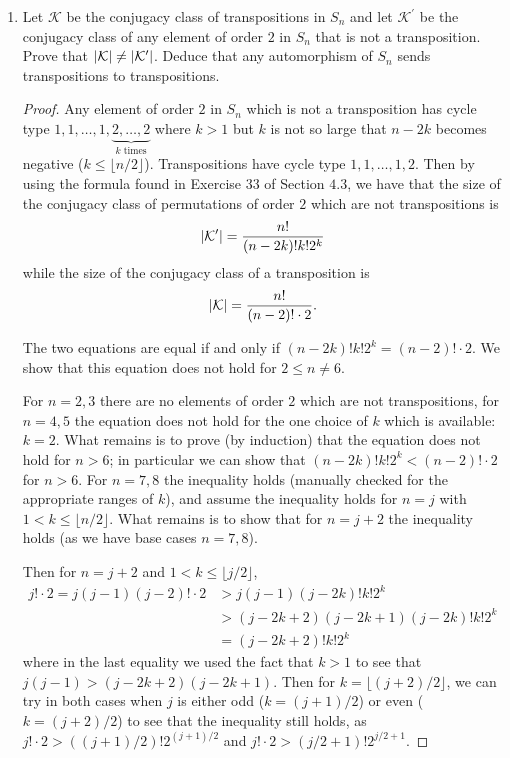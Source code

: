 \documentclass[11pt]{article}
\begin{document}
\begin{enumerate}
\begin{enumerate}[label=(\alph*)]
\begin{proof}
        Hence $\sigma(\mathcal{K})$ is a conjugacy class (we may think of it as the conjugacy class of $\sigma(x)$).
      \end{proof}
      \item Let $\mathcal{K}$ be the conjugacy class of transpositions in $S_n$ and let $\mathcal{K}^{\prime}$ be the conjugacy class of any element of order $2$ in $S_n$ that is not a transposition. Prove that $\abs{\mathcal{K}}\neq \abs{\mathcal{K}^{\prime}}$. Deduce that any automorphism of $S_n$ sends transpositions to transpositions.
      \begin{proof}
        Any element of order $2$ in $S_n$ which is not a transposition has cycle type $1, 1, \dots, 1, \underbrace{2,\dots, 2}_{k\text{ times}}$ where $k> 1$ but $k$ is not so large that $n-2k$ becomes negative ($k\leq \lfloor n/2\rfloor$). Transpositions have cycle type $1, 1, \dots, 1, 2$. Then by using the formula found in Exercise $33$ of Section $4.3$, we have that the size of the conjugacy class of permutations of order $2$ which are not transpositions is \[\abs{\mathcal{K}^{\prime}} = \frac{n!}{(n-2k)!k!2^k}\] while the size of the conjugacy class of a transposition is \[\abs{\mathcal{K}} = \frac{n!}{(n-2)!\cdot 2}.\]

        The two equations are equal if and only if $(n-2k)!k!2^k = (n-2)!\cdot 2$. We show that this equation does not hold for $2\leq n\neq 6$.

        For $n = 2, 3$ there are no elements of order $2$ which are not transpositions, for $n= 4, 5$ the equation does not hold for the one choice of $k$ which is available: $k= 2$. What remains is to prove (by induction) that the equation does not hold for $n> 6$; in particular we can show that $(n-2k)!k!2^k < (n-2)!\cdot 2$ for $n>6$. For $n = 7, 8$ the inequality holds (manually checked for the appropriate ranges of $k$), and assume the inequality holds for $n = j$ with $1< k \leq \lfloor n/2\rfloor$. What remains is to show that for $n = j+2$ the inequality holds (as we have base cases $n = 7,8$).

        Then for $n = j+2$ and $1< k \leq \lfloor j/2\rfloor$, \begin{align*}
          j!\cdot 2 = j(j-1)(j-2)!\cdot 2 &> j(j-1)(j-2k)!k!2^k \\
          &> (j-2k+2)(j-2k+1)(j-2k)!k!2^k\\
          &= (j-2k+2)!k!2^k
        \end{align*}
        where in the last equality we used the fact that $k>1$ to see that $j(j-1) > (j-2k+2)(j-2k+1)$. Then for $k = \lfloor (j+2)/2\rfloor$, we can try in both cases when $j$ is either odd ($k = (j+1)/2$) or even ($k = (j+2)/2$) to see that the inequality still holds, as $j!\cdot 2 > ((j+1)/2)!2^{(j+1)/2}$ and $j!\cdot 2 > (j/2 + 1)!2^{j/2+1}$.


\end{proof}
\end{enumerate}
\end{enumerate}
\end{document}

